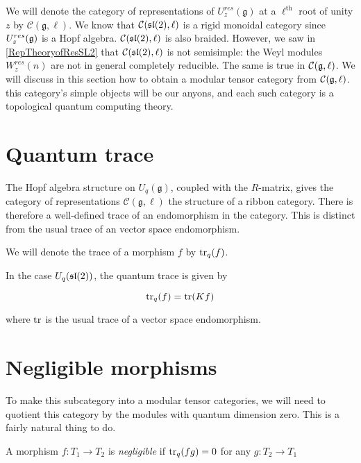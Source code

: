 We will denote the category of representations of $U_z^{res}(\mathfrak{g})$ at a
$\ell^\text{th}$ root of unity $z$ by $\mathcal{C}(\mathfrak{g}, \ell)$. We
know that $\mathcal{C}(\mathfrak{sl}(2), \ell)$ is a rigid monoidal category since
$U_z^{res}(\mathfrak{g})$ is a Hopf algebra. $\mathcal{C}(\mathfrak{sl}(2), \ell)$ is also
braided. However, we saw in \ref{RepTheoryofResSL2} that $\mathcal{C}(\mathfrak{sl}(2),
\ell)$ is not semisimple: the Weyl modules $W_z^{res}(n)$ are not in general
completely reducible. The same is true in $\mathcal{C}(\mathfrak{g}, \ell)$.  We will
discuss in this section how to obtain a modular tensor category from
$\mathcal{C}(\mathfrak{g}, \ell)$. this category's simple objects will be our anyons,
and each such category is a topological quantum computing theory. 



\section{Quantum trace}

The Hopf algebra structure on $U_q(\mathfrak{g})$, coupled with the $R$-matrix,
gives the category of representations $\mathcal{C}(\mathfrak{g}, \ell)$ the
structure of a ribbon category. There is therefore a well-defined trace of an
endomorphism in the category. This is distinct from the usual trace of an
vector space endomorphism. 

We will denote the trace of a morphism $f$ by $\operatorname{tr}_q(f)$.

In the case $U_q(\mathfrak{sl}(2))$, the quantum trace is given by 

\begin{equation}
    \operatorname{tr}_q(f) = \operatorname{tr}(Kf)
\end{equation}

where $\operatorname{tr}$ is the usual trace of a vector space endomorphism.

\section{Negligible morphisms}
To make this subcategory into a modular tensor categories, we will need to
quotient this category by the modules with quantum dimension zero. This is a
fairly natural thing to do.  

\begin{defn}
    A morphism $f: T_1 \to T_2$ is \emph{negligible} if $\operatorname{tr}_q(fg) = 0$ for any $g: T_2 \to T_1$
\end{defn}


